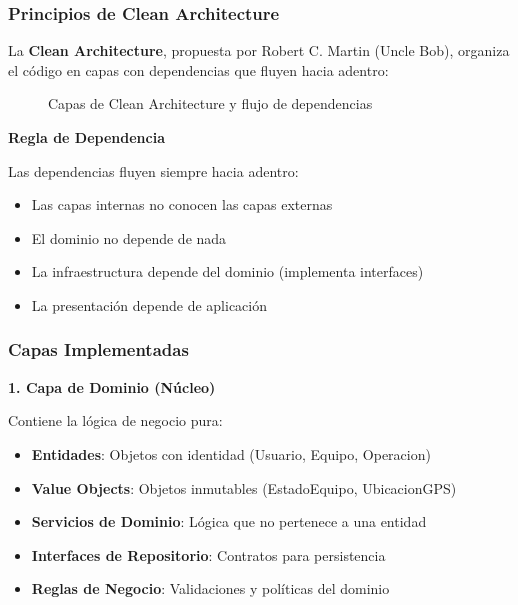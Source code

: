 \documentclass[12pt,a4paper]{article}
\begin{document}
\subsubsection{Principios de Clean Architecture}

La \textbf{Clean Architecture}, propuesta por Robert C. Martin (Uncle Bob), organiza el código en capas con dependencias que fluyen hacia adentro:

\begin{figure}[H]
\centering
{}
\caption{Capas de Clean Architecture y flujo de dependencias}
\end{figure}

\textbf{Regla de Dependencia}

Las dependencias fluyen siempre hacia adentro:
\begin{itemize}
    \item Las capas internas no conocen las capas externas
    \item El dominio no depende de nada
    \item La infraestructura depende del dominio (implementa interfaces)
    \item La presentación depende de aplicación
\end{itemize}

\subsubsection{Capas Implementadas}

\textbf{1. Capa de Dominio (Núcleo)}

Contiene la lógica de negocio pura:
\begin{itemize}
    \item \textbf{Entidades}: Objetos con identidad (Usuario, Equipo, Operacion)
    \item \textbf{Value Objects}: Objetos inmutables (EstadoEquipo, UbicacionGPS)
    \item \textbf{Servicios de Dominio}: Lógica que no pertenece a una entidad
    \item \textbf{Interfaces de Repositorio}: Contratos para persistencia
    \item \textbf{Reglas de Negocio}: Validaciones y políticas del dominio
\end{itemize}
\end{document}
